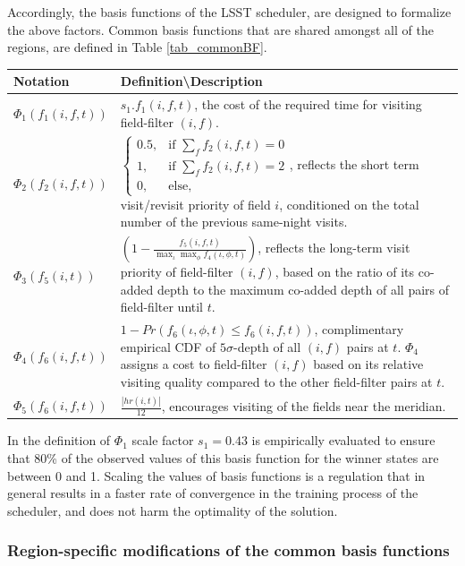 \documentclass[12pt,aas_macros]{article}
\theoremstyle{definition}
\begin{document}
Accordingly, the basis functions of the LSST scheduler, are designed to formalize the above factors. Common basis functions that are shared amongst all of the regions, are defined in Table \ref{tab_commonBF}.


\begin{table}[h]
\begin{tabularx}{\textwidth}{| l | X |}
\hline
Notation & Definition\textbackslash Description\\ \hline \hline
$\Phi_1(f_1(i,f,t))$ & $s_1.f_1(i,f,t)$, the cost of the required time for visiting field-filter $(i,f)$.\\ \hline
$\Phi_2(f_2(i,f,t))$ &$\begin{cases}0.5,& \text{if } \sum\limits_{f}{f_2(i,f,t)} = 0\\ 1,& \text{if } \sum\limits_{f}{f_2(i,f,t)} = 2\\ 0,  & \text{else,}\end{cases}$, \newline reflects the short term visit/revisit priority of field $i$, conditioned on the total number of the previous same-night visits.\\ \hline
$\Phi_3(f_5(i,t))$ &  $(1 - \frac{f_5(i,f,t)}{\max_\iota \max_\phi f_4(\iota,\phi,t)})$, reflects the long-term visit priority of field-filter $(i,f)$, based on the ratio of its co-added depth to the maximum co-added depth of all pairs of field-filter until $t$.\\ \hline
$\Phi_4(f_6(i,f,t))$ & $1 - Pr(f_6(\iota,\phi,t) \leq f_6(i,f,t))$, complimentary empirical CDF of $5\sigma$-depth of all $(i,f)$ pairs at $t$. $\Phi_4$ assigns a cost to field-filter $(i,f)$ based on its relative visiting quality compared to the other field-filter pairs at $t$.\\ \hline
$\Phi_5(f_6(i,f,t))$ &  $\frac{|hr(i,t)|}{12}$, encourages visiting of the fields near the meridian.\\ \hline
\end{tabularx}
\end{table}\label{tab_commonBF}

In the definition of $\Phi_1$ scale factor $s_1= 0.43$ is empirically evaluated to ensure that 80\% of the observed values of this basis function for the winner states are between 0 and 1. Scaling the values of basis functions is a regulation that in general results in a faster rate of convergence in the training process of the scheduler, and does not harm the optimality of the solution.

\subsubsection{Region-specific modifications of the common basis functions}
\end{document}
